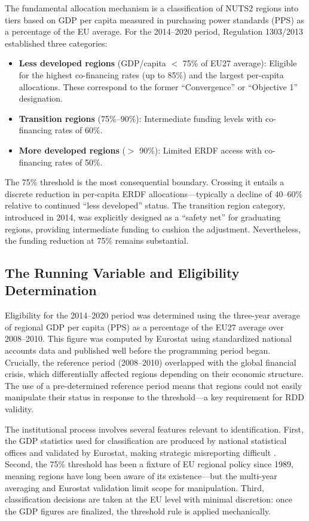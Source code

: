 \documentclass[12pt]{article}
\begin{document}
The fundamental allocation mechanism is a classification of NUTS2 regions into tiers based on GDP per capita measured in purchasing power standards (PPS) as a percentage of the EU average. For the 2014--2020 period, Regulation 1303/2013 established three categories:
\begin{itemize}
    \item \textbf{Less developed regions} (GDP/capita $<$ 75\% of EU27 average): Eligible for the highest co-financing rates (up to 85\%) and the largest per-capita allocations. These correspond to the former ``Convergence'' or ``Objective 1'' designation.
    \item \textbf{Transition regions} (75\%--90\%): Intermediate funding levels with co-financing rates of 60\%.
    \item \textbf{More developed regions} ($>$ 90\%): Limited ERDF access with co-financing rates of 50\%.
\end{itemize}

The 75\% threshold is the most consequential boundary. Crossing it entails a discrete reduction in per-capita ERDF allocations---typically a decline of 40--60\% relative to continued ``less developed'' status. The transition region category, introduced in 2014, was explicitly designed as a ``safety net'' for graduating regions, providing intermediate funding to cushion the adjustment. Nevertheless, the funding reduction at 75\% remains substantial.

\subsection{The Running Variable and Eligibility Determination}

Eligibility for the 2014--2020 period was determined using the three-year average of regional GDP per capita (PPS) as a percentage of the EU27 average over 2008--2010. This figure was computed by Eurostat using standardized national accounts data and published well before the programming period began. Crucially, the reference period (2008--2010) overlapped with the global financial crisis, which differentially affected regions depending on their economic structure. The use of a pre-determined reference period means that regions could not easily manipulate their status in response to the threshold---a key requirement for RDD validity.

The institutional process involves several features relevant to identification. First, the GDP statistics used for classification are produced by national statistical offices and validated by Eurostat, making strategic misreporting difficult \citep{BeckerEggerVonEhrlich2010}. Second, the 75\% threshold has been a fixture of EU regional policy since 1989, meaning regions have long been aware of its existence---but the multi-year averaging and Eurostat validation limit scope for manipulation. Third, classification decisions are taken at the EU level with minimal discretion: once the GDP figures are finalized, the threshold rule is applied mechanically.
\end{document}

